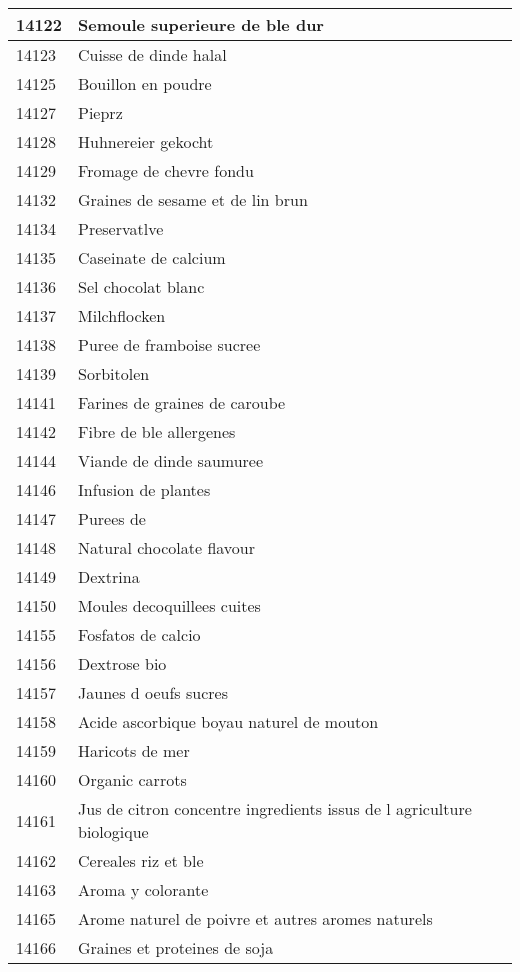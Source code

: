 \begin{longtable}{|l|l|}
14122 & Semoule superieure de ble dur \\ \hline 
14123 & Cuisse de dinde halal \\ \hline 
14125 & Bouillon en poudre \\ \hline 
14127 & Pieprz \\ \hline 
14128 & Huhnereier gekocht \\ \hline 
14129 & Fromage de chevre fondu \\ \hline 
14132 & Graines de sesame et de lin brun \\ \hline 
14134 & Preservatlve \\ \hline 
14135 & Caseinate de calcium \\ \hline 
14136 & Sel chocolat blanc \\ \hline 
14137 & Milchflocken \\ \hline 
14138 & Puree de framboise sucree \\ \hline 
14139 & Sorbitolen \\ \hline 
14141 & Farines de graines de caroube \\ \hline 
14142 & Fibre de ble allergenes \\ \hline 
14144 & Viande de dinde saumuree \\ \hline 
14146 & Infusion de plantes \\ \hline 
14147 & Purees de \\ \hline 
14148 & Natural chocolate flavour \\ \hline 
14149 & Dextrina \\ \hline 
14150 & Moules decoquillees cuites \\ \hline 
14155 & Fosfatos de calcio \\ \hline 
14156 & Dextrose bio \\ \hline 
14157 & Jaunes d oeufs sucres \\ \hline 
14158 & Acide ascorbique boyau naturel de mouton \\ \hline 
14159 & Haricots de mer \\ \hline 
14160 & Organic carrots \\ \hline 
14161 & Jus de citron concentre ingredients issus de l agriculture biologique \\ \hline 
14162 & Cereales riz et ble \\ \hline 
14163 & Aroma y colorante \\ \hline 
14165 & Arome naturel de poivre et autres aromes naturels \\ \hline 
14166 & Graines et proteines de soja \\ \hline 

\end{longtable}
